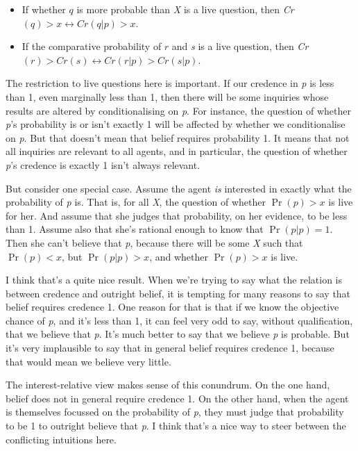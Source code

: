 \documentclass[
  10pt,
  letterpaper,
  DIV=11,
  numbers=noendperiod,
  twoside]{scrartcl}
\begin{document}
\begin{itemize}
\item
  If whether \(q\) is more probable than \emph{X} is a live question,
  then \emph{Cr}\((q) > x \leftrightarrow \textit{Cr}(q | p) > x\).
\item
  If the comparative probability of \(r\) and \emph{s} is a live
  question, then
  \emph{Cr}\((r) > \textit{Cr}(s) \leftrightarrow \textit{Cr}(r | p) > \textit{Cr}(s | p)\).
\end{itemize}

The restriction to live questions here is important. If our credence in
\emph{p} is less than 1, even marginally less than 1, then there will be
some inquiries whose results are altered by conditionalising on
\emph{p}. For instance, the question of whether \emph{p}'s probability
is or isn't exactly 1 will be affected by whether we conditionalise on
\emph{p}. But that doesn't mean that belief requires probability 1. It
means that not all inquiries are relevant to all agents, and in
particular, the question of whether \emph{p}'s credence is exactly 1
isn't always relevant.

But consider one special case. Assume the agent \emph{is} interested in
exactly what the probability of \emph{p} is. That is, for all \emph{X},
the question of whether \(\Pr(p) > x\) is live for her. And assume that
she judges that probability, on her evidence, to be less than 1. Assume
also that she's rational enough to know that \(\Pr(p | p) = 1\). Then
she can't believe that \emph{p}, because there will be some \emph{X}
such that \(\Pr(p) < x\), but \(\Pr(p | p) > x\), and whether
\(\Pr(p) > x\) is live.

I think that's a quite nice result. When we're trying to say what the
relation is between credence and outright belief, it is tempting for
many reasons to say that belief requires credence 1. One reason for that
is that if we know the objective chance of \emph{p}, and it's less than
1, it can feel very odd to say, without qualification, that we believe
that \emph{p}. It's much better to say that we believe \emph{p} is
probable. But it's very implausible to say that in general belief
requires credence 1, because that would mean we believe very little.

The interest-relative view makes sense of this conundrum. On the one
hand, belief does not in general require credence 1. On the other hand,
when the agent is themselves focussed on the probability of \emph{p},
they must judge that probability to be 1 to outright believe that
\emph{p}. I think that's a nice way to steer between the conflicting
intuitions here.
\end{document}

